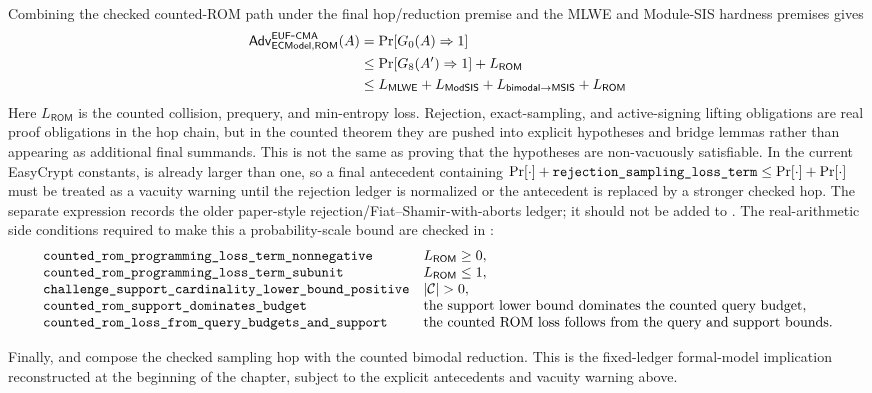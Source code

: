 Combining the checked counted-ROM path under the final hop/reduction premise and
the MLWE and Module-SIS hardness premises gives
\[
\begin{aligned}
  \mathsf{Adv}_{\mathsf{ECModel},\mathsf{ROM}}^{\mathsf{EUF}\mbox{-}\mathsf{CMA}}(A)
  &=
  \Pr[G_0(A)\Rightarrow 1] \\
  &\le
  \Pr[G_8(A')\Rightarrow 1] + L_{\mathsf{ROM}} \\
  &\le
  L_{\mathsf{MLWE}}
  + L_{\mathsf{ModSIS}}
  + L_{\mathsf{bimodal}\to\mathsf{MSIS}}
  + L_{\mathsf{ROM}}
\end{aligned}
\]
Here \(L_{\mathsf{ROM}}\) is the counted collision, prequery, and min-entropy
loss.  Rejection, exact-sampling, and active-signing lifting obligations are real
proof obligations in the hop chain, but in the counted theorem they are pushed
into explicit hypotheses and bridge lemmas rather than appearing as additional
final summands.  This is not the same as proving that the hypotheses are
non-vacuously satisfiable.  In the current EasyCrypt constants,
 is already larger than one, so a final
antecedent containing
\(\Pr[\cdot]+\texttt{rejection\_sampling\_loss\_term}\le \Pr[\cdot]+\Pr[\cdot]\)
must be treated as a vacuity warning until the rejection ledger is normalized or
the antecedent is replaced by a stronger checked hop.  The separate expression
 records the older paper-style
rejection/Fiat--Shamir-with-aborts ledger; it should not be added to
.
The real-arithmetic side conditions required to make this a probability-scale
bound are checked in :
\[
\begin{array}{ll}
\ec{counted\_rom\_programming\_loss\_term\_nonnegative} &
  L_{\mathsf{ROM}}\ge 0,\\
\ec{counted\_rom\_programming\_loss\_term\_subunit} &
  L_{\mathsf{ROM}}\le 1,\\
\ec{challenge\_support\_cardinality\_lower\_bound\_positive} &
  |\mathcal{C}|>0,\\
\ec{counted\_rom\_support\_dominates\_budget} &
  \text{the support lower bound dominates the counted query budget},\\
\ec{counted\_rom\_loss\_from\_query\_budgets\_and\_support} &
  \text{the counted ROM loss follows from the query and support bounds}.
\end{array}
\]

Finally, 
and 
compose the checked sampling hop with the counted bimodal reduction.  This is
the fixed-ledger formal-model implication reconstructed at the beginning of the
chapter, subject to the explicit antecedents and vacuity warning above.

